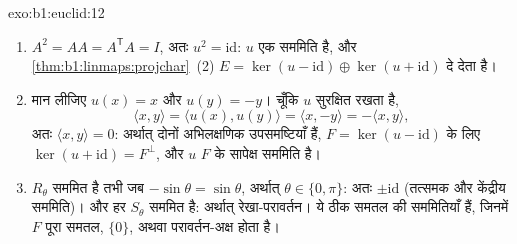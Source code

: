 \begin{solution}{exo:b1:euclid:12}
\begin{enumerate}
  \item $A^2 = A A = A^{\mathsf T} A = I$, अतः $u^2 = \mathrm{id}$: $u$ एक
  सममिति है, और \cref{thm:b1:linmaps:projchar}~(2) $E = \ker(u -
  \mathrm{id}) \oplus \ker(u + \mathrm{id})$ दे देता है।
  \item मान लीजिए $u(x) = x$ और $u(y) = -y$। चूँकि $u$  सुरक्षित
  रखता है,
        \[
        \langle x, y\rangle = \langle u(x), u(y)\rangle
        = \langle x, -y\rangle = -\langle x, y\rangle ,
        \]
        अतः $\langle x, y\rangle = 0$: अर्थात् दोनों अभिलक्षणिक उपसमष्टियाँ
         हैं, $F = \ker(u - \mathrm{id})$ के लिए $\ker(u +
        \mathrm{id}) = F^\perp$, और $u$ $F$ के सापेक्ष  सममिति है।
  \item $R_\theta$ सममित है तभी जब $-\sin\theta = \sin\theta$, अर्थात्
  $\theta \in \{0, \pi\}$: अतः  $\pm\mathrm{id}$ (तत्समक और
  केंद्रीय सममिति)। और हर $S_\theta$ सममित है: अर्थात् रेखा-परावर्तन। ये ठीक
  समतल की  सममितियाँ हैं, जिनमें $F$ पूरा समतल, $\{0\}$, अथवा
  परावर्तन-अक्ष होता है।
\end{enumerate}
\end{solution}

